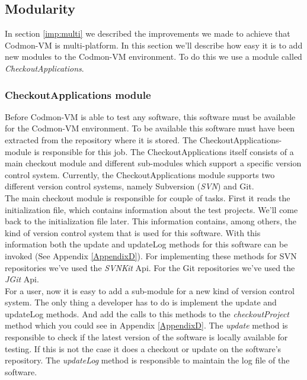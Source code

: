\documentclass{article}
\newcommand{\project}{Codmon-VM}
\begin{document}
\subsection{Modularity}
\label{imp:modular}
In section \ref{imp:multi} we described the improvements we made to achieve that \project{} is multi-platform. In this section we'll describe how easy it is to add new modules to the \project{} environment. 
To do this we use a module called \emph{CheckoutApplications}.


\subsubsection{CheckoutApplications module}
\label{imp:checkout}
Before \project{} is able to test any software, this software must be available for the \project{} environment. To be available this software must have been extracted from the repository where it is stored. 
The CheckoutApplications-module is responsible for this job. The CheckoutApplications itself consists of a main checkout module and different sub-modules which support a specific version control system. 
Currently, the CheckoutApplications module supports two different version control systems, namely Subversion (\emph{SVN}) and Git.\\

\noindent
The main checkout module is responsible for couple of tasks. First it reads the initialization file, which contains information about the test projects. We'll come back to the initialization file later. This 
information contains, among others, the kind of version control system that is used for this software. With this information both the update and updateLog methods for this software can be invoked (See 
Appendix \ref{AppendixD}). For implementing these methods for SVN repositories we've used the \emph{SVNKit} Api\cite{SVNKit}. For the Git repositories we've used the \emph{JGit} 
Api\cite{JGit}.\\

\noindent For a user, now it is easy to add a sub-module for a new kind of version control system. The only thing a developer has to do is implement the update and updateLog methods. And add the calls to
this methods to the \emph{checkoutProject} method which you could see in Appendix \ref{AppendixD}. The \emph{update} method is responsible to check if the latest version of the software is locally available for 
testing. If this is not the case it does a checkout or update on the software's repository. The \emph{updateLog} method is responsible to maintain the log file of the software. 
\end{document}

